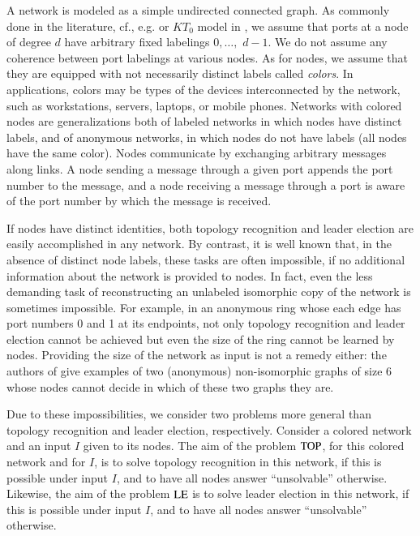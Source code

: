 \documentclass[a4paper,10pt]{article}
\newcommand{\problemLE}{\textup{LE}}
\newcommand{\problemTOP}{\textup{TOP}}
\begin{document}
A network is modeled as a simple undirected connected graph. As commonly done in the literature, cf., e.g. \cite{YK3} {or $KT_0$ model in \cite{AGPV}}, we assume that
ports at a node of degree $d$ have arbitrary fixed labelings $0,\dots,$ $d-1$.
We do not assume any coherence between port labelings at various nodes.
As for nodes, we assume that they are equipped with not necessarily distinct labels called {\em colors}.  In applications, colors may be types of the devices interconnected by the network, 
such as workstations, servers, laptops, or mobile phones.
Networks with colored nodes are generalizations both of labeled networks in which nodes have distinct labels, and of anonymous 
networks, in which nodes do not have labels (all nodes have the same color). 
Nodes communicate by exchanging arbitrary messages along links. A node sending a message
through a given port appends the port number to the message, and a node receiving a message
through a port is aware of the port number by which the message is received.

If nodes have distinct identities, both topology recognition and leader election are easily accomplished in any network. By contrast, it is well known that, in the absence of distinct node labels, these tasks are often impossible, if no additional information about the network is provided to nodes. In fact, even the less demanding task of reconstructing an unlabeled isomorphic copy of the
network is sometimes impossible. 
For example, in an anonymous ring whose each edge has port numbers 0 and 1 at its
endpoints, not only topology recognition and leader election cannot be achieved but even 
the size of the ring cannot be learned by nodes. Providing the size of the network as input is not a remedy
either: the authors of \cite{YK3} give examples of two (anonymous) non-isomorphic graphs of size 6 whose
nodes cannot decide in which of these two graphs they are.

Due to these impossibilities, we consider two problems more general than topology recognition
and leader election, respectively.
Consider a colored network and an input $I$ given to its nodes.
The aim of the problem $\problemTOP$, for this colored network and for $I$, is to solve topology recognition in this network, if this is possible under input $I$, and to have all nodes answer ``unsolvable'' otherwise.
Likewise, the aim of the problem $\problemLE$ is to solve leader election in this network, if this is possible under input $I$, and to have all nodes answer ``unsolvable'' otherwise. 
\end{document}
